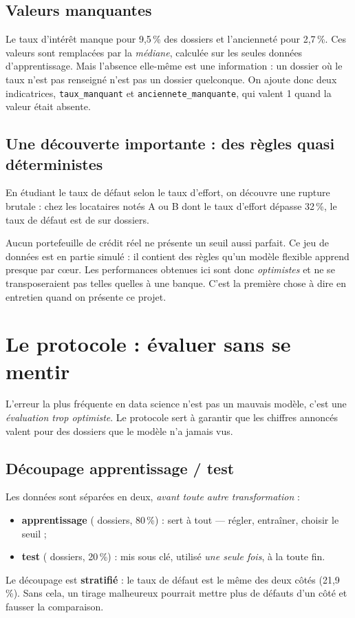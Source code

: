 \documentclass[11pt,a4paper]{article}
\newcommand{\code}[1]{\texttt{#1}}
\begin{document}
\subsection{Valeurs manquantes}
Le taux d'intérêt manque pour 9,5\,\% des dossiers et l'ancienneté pour 2,7\,\%. Ces valeurs sont remplacées par la \emph{médiane}, calculée sur les seules données d'apprentissage. Mais l'absence elle-même est une information : un dossier où le taux n'est pas renseigné n'est pas un dossier quelconque. On ajoute donc deux indicatrices, \code{taux\_manquant} et \code{anciennete\_manquante}, qui valent 1 quand la valeur était absente.

\subsection{Une découverte importante : des règles quasi déterministes}
\label{sec:regles}
En étudiant le taux de défaut selon le taux d'effort, on découvre une rupture brutale : chez les locataires notés A ou B dont le taux d'effort dépasse 32\,\%, le taux de défaut est de \textbf{\tauxRegle{}} sur \nRegle{} dossiers.

\begin{alerte}
Aucun portefeuille de crédit réel ne présente un seuil aussi parfait. Ce jeu de données est en partie simulé : il contient des règles qu'un modèle flexible apprend presque par cœur. Les performances obtenues ici sont donc \emph{optimistes} et ne se transposeraient pas telles quelles à une banque. C'est la première chose à dire en entretien quand on présente ce projet.
\end{alerte}

\section{Le protocole : évaluer sans se mentir}

L'erreur la plus fréquente en data science n'est pas un mauvais modèle, c'est une \emph{évaluation trop optimiste}. Le protocole sert à garantir que les chiffres annoncés valent pour des dossiers que le modèle n'a jamais vus.

\subsection{Découpage apprentissage / test}
Les données sont séparées en deux, \emph{avant toute autre transformation} :
\begin{itemize}
\item \textbf{apprentissage} (\nApprentissage{} dossiers, 80\,\%) : sert à tout — régler, entraîner, choisir le seuil ;
\item \textbf{test} (\nTest{} dossiers, 20\,\%) : mis sous clé, utilisé \emph{une seule fois}, à la toute fin.
\end{itemize}
Le découpage est \textbf{stratifié} : le taux de défaut est le même des deux côtés (21,9\,\%). Sans cela, un tirage malheureux pourrait mettre plus de défauts d'un côté et fausser la comparaison.
\end{document}
